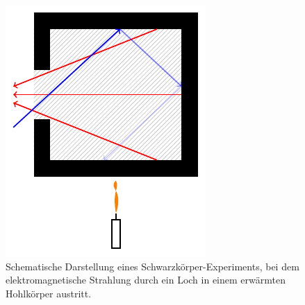 %
%
%
\begin{figure}
\centering
\includegraphics{papers/fourier/images/Schwarzkoerper.pdf}
\caption{Schematische Darstellung eines Schwarzkörper-Experiments, bei dem elektromagnetische Strahlung durch ein Loch in einem erwärmten Hohlkörper austritt.%
\label{fourier:fig:schwarzkoerper}}
\end{figure}